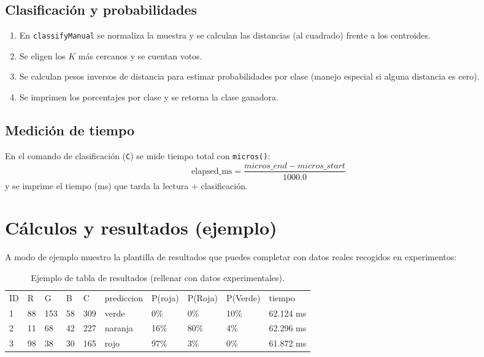 \documentclass[conference]{IEEEtran}
\begin{document}
\subsection{Clasificación y probabilidades}
\begin{enumerate}
  \item En \texttt{classifyManual} se normaliza la muestra y se calculan las distancias (al cuadrado) frente a los centroides.
  \item Se eligen los $K$ más cercanos y se cuentan votos.
  \item Se calculan pesos inversos de distancia para estimar probabilidades por clase (manejo especial si alguna distancia es cero).
  \item Se imprimen los porcentajes por clase y se retorna la clase ganadora.
\end{enumerate}

\subsection{Medición de tiempo}
En el comando de clasificación (\texttt{C}) se mide tiempo total con \texttt{micros()}:
\[
\text{elapsed\_ms} = \frac{micros\_end - micros\_start}{1000.0}
\]
y se imprime el tiempo (ms) que tarda la lectura + clasificación.

\section{Cálculos y resultados (ejemplo)}
A modo de ejemplo muestro la plantilla de resultados que puedes completar con datos reales recogidos en experimentos:

\begin{table}[htbp]
\centering
\caption{Ejemplo de tabla de resultados (rellenar con datos experimentales).}


\begin{tabular}{llllllllll}
\cline{10-10}
ID & R  & G   & B  & C   & prediccion & P(roja) & P(Roja) & \multicolumn{1}{l|}{P(Verde)} & \multicolumn{1}{l|}{tiempo} \\ \cline{10-10} 
1  & 88 & 153 & 58 & 309 & verde      & 0\%     & 0\%     & 10\%                          & 62.124 ms                   \\
2  & 11 & 68  & 42 & 227 & naranja    & 16\%    & 80\%    & 4\%                           & 62.296 ms                   \\
3  & 98 & 38  & 30 & 165 & rojo       & 97\%    & 3\%     & 0\%                           & 61.872 ms                  
\end{tabular}
\end{table}
\end{document}
